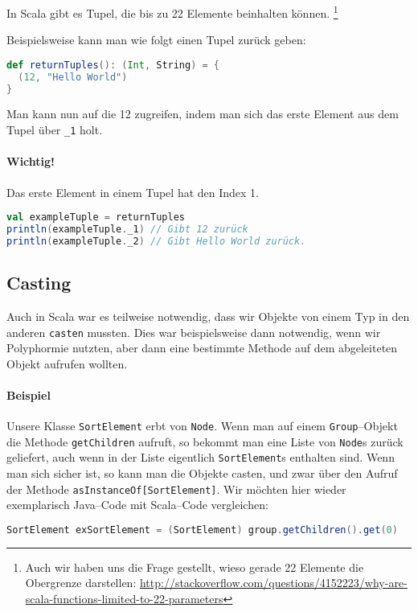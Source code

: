 In Scala gibt es Tupel, die bis zu 22 Elemente beinhalten können. \footnote{Auch wir haben uns die Frage gestellt, wieso gerade 22 Elemente die Obergrenze darstellen: \url{http://stackoverflow.com/questions/4152223/why-are-scala-functions-limited-to-22-parameters}}

Beispielsweise kann man wie folgt einen Tupel zurück geben:

\begin{lstlisting}[language=Scala, numbers=none]
def returnTuples(): (Int, String) = {
  (12, "Hello World")
}
\end{lstlisting}

Man kann nun auf die 12 zugreifen, indem man sich das erste Element aus dem Tupel über \texttt{\_1} holt.
\paragraph{Wichtig!}Das erste Element in einem Tupel hat den Index 1.

\begin{lstlisting}[language=Scala, numbers=none, caption=Zugriff auf die Elemente eines Tupels]
val exampleTuple = returnTuples
println(exampleTuple._1) // Gibt 12 zurück
println(exampleTuple._2) // Gibt Hello World zurück.
\end{lstlisting}

\subsection{Casting}
Auch in Scala war es teilweise notwendig, dass wir Objekte von einem Typ in den anderen \texttt{casten} mussten. Dies war beispielsweise dann notwendig, wenn wir Polyphormie nutzten, aber dann eine bestimmte Methode auf dem abgeleiteten Objekt aufrufen wollten.

\paragraph{Beispiel} Unsere Klasse \texttt{SortElement} erbt von \texttt{Node}. Wenn man auf einem \texttt{Group}--Objekt die Methode \texttt{getChildren} aufruft, so bekommt man eine Liste von \texttt{Node}s zurück geliefert, auch wenn in der Liste eigentlich \texttt{SortElement}s enthalten sind. Wenn man sich sicher ist, so kann man die Objekte casten, und zwar über den Aufruf der Methode \texttt{asInstanceOf[SortElement]}. Wir möchten hier wieder exemplarisch Java--Code mit Scala--Code vergleichen:

\begin{lstlisting}[language=Java,numbers=none,caption=Casting in Java: Von Node zu SortElement]
SortElement exSortElement = (SortElement) group.getChildren().get(0)
\end{lstlisting}

